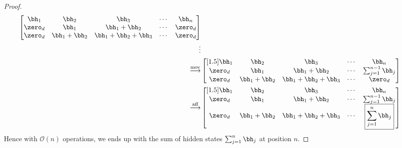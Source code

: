\begin{proof}
\begin{equation}
\begin{aligned}
\begin{bmatrix}
    \bh_1 & \bh_2 & \bh_3 &\cdots & \bh_n \\
    \zero_d & \bh_1 & \bh_1 + \bh_2 & \cdots & \zero_d \\
    \zero_d & \bh_1 + \bh_2 & \bh_1 + \bh_2 + \bh_3 & \cdots & \zero_d  
\end{bmatrix}  \\
\vdots \\
\overset{\mathrm{mov}}{\longrightarrow} & \begin{bmatrix}[1.5]
    \bh_1 & \bh_2 & \bh_3 &\cdots & \bh_n \\
    \zero_d & \bh_1 & \bh_1 + \bh_2 & \cdots & \sum_{j=1}^{n-1} \bh_j \\
    \zero_d & \bh_1 + \bh_2 & \bh_1 + \bh_2 + \bh_3 & \cdots & \zero_d  
\end{bmatrix} \\
\overset{\mathrm{aff}}{\longrightarrow}
&\begin{bmatrix}[1.5]
    \bh_1 & \bh_2 & \bh_3 &\cdots & \bh_n \\
    \zero_d & \bh_1 & \bh_1 + \bh_2 & \cdots & \sum_{j=1}^{n-1} \bh_j \\
    \zero_d & \bh_1 + \bh_2 & \bh_1 + \bh_2 + \bh_3 & \cdots & \boxed{\sum_{j=1}^{n} \bh_j}
\end{bmatrix} 
\end{aligned}
\end{equation}
Hence with $\mathcal O(n)$ operations, we ends up with the sum of hidden states $\sum_{j=1}^{n} \bh_j$ at position $n$.
\end{proof}

